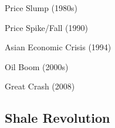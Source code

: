 \documentclass[10pt]{article}
\begin{document}
    \begin{core}{Price Slump (1980s)}


    \end{core}

    \begin{core}{Price Spike/Fall (1990)}


    \end{core}

    \begin{core}{Asian Economic Crisis (1994)}


    \end{core}

    \begin{core}{Oil Boom (2000s)}


    \end{core}

    \begin{core}{Great Crash (2008)}


    \end{core}

  \subsection{Shale Revolution}
\end{document}
